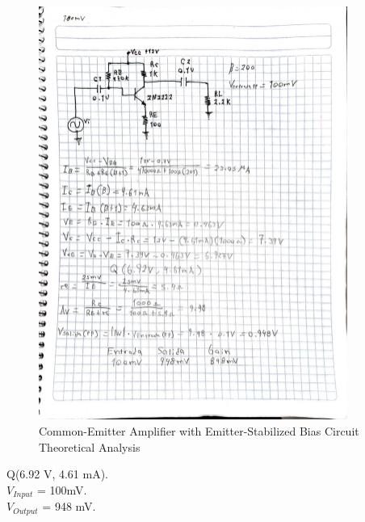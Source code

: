 \begin{figure}[H]
    \centering
    \includegraphics[width = 0.9\textwidth]{Imagenes/Imagenes_Juan/AnalisisTeorico_Circuito2.jpg}
    \caption{Common-Emitter Amplifier with Emitter-Stabilized Bias Circuit Theoretical Analysis}
    \label{circuit1Teorico2}
\end{figure}

\begin{center}
    Q(6.92 V, 4.61 mA). \\
    \texorpdfstring{$V_{Input}$}{Vinput} = 100mV. \\
    \texorpdfstring{$V_{Output}$}{Voutput} = 948 mV.
\end{center}
